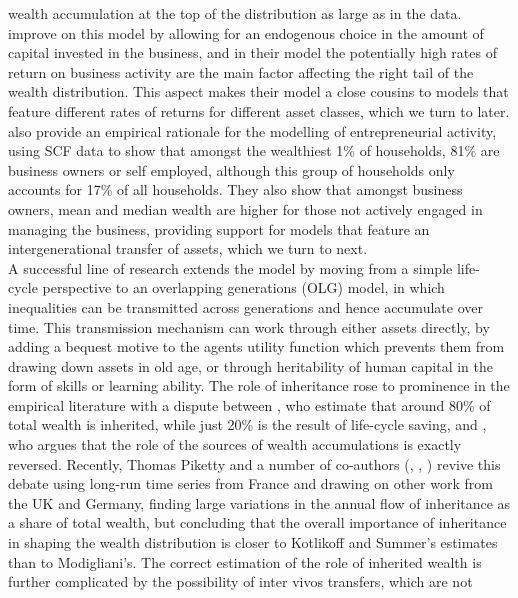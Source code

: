 wealth accumulation at the top of the distribution as large as in the data. 
\citet{CagettiDeNardi2006} improve on this model by allowing for an endogenous
choice in the amount of capital invested in the business, and in their model the
potentially high rates of return on business activity are the main factor 
affecting the right tail of the wealth distribution. This aspect makes their 
model a close cousins to models that feature different rates of returns for 
different asset classes, which we turn to later. \citet{CagettiDeNardi2006}
also provide an empirical rationale for the modelling of entrepreneurial 
activity, using SCF data to show that amongst the wealthiest 1\% of households,
81\% are business owners or self employed, although this group of households 
only accounts for 17\% of all households. They also show that amongst business
owners, mean and median wealth are higher for those not actively engaged in 
managing the business, providing support for models that feature an intergenerational
transfer of assets, which we turn to next.
\vspace{0.5cm} \\
A successful line of research extends the model by moving from a simple life-
cycle perspective to an overlapping generations (OLG) model, in which inequalities
can be transmitted across generations and hence accumulate over time. This 
transmission mechanism can work through either assets directly, by adding 
a bequest motive to the agents utility function which prevents them from drawing
down assets in old age, or through heritability of human capital in the form 
of skills or learning ability. The role of inheritance rose to prominence in the 
empirical literature with a dispute between \citet{KotlikoffSummers1981}, who 
estimate that around 80\% of total wealth is inherited, while just 20\% is 
the result of life-cycle saving, and \citet{Modigliani1986}, who argues that the 
role of the sources of wealth accumulations is exactly reversed. Recently, Thomas
Piketty and a number of co-authors (\citealt{Piketty2011}, 
\citealt{PikettyPostelRosenthal2014}, \citealt{PikettyZucman2015}) revive this
debate using long-run time series from France and drawing on other work from 
the UK and Germany, finding large variations in the annual flow of inheritance
as a share of total wealth, but concluding that the overall importance of inheritance
in shaping the wealth distribution is closer to Kotlikoff and Summer's estimates
than to Modigliani's. The correct estimation of the role of inherited wealth is
further complicated by the possibility of inter vivos transfers, which are not
